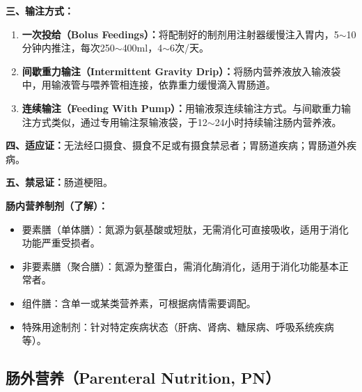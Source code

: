 \begin{tipbox}
\textbf{三、输注方式：}
\begin{enumerate}[leftmargin=*]
    \item \textbf{一次投给（Bolus Feedings）：}将配制好的制剂用注射器缓慢注入胃内，5$\sim$10分钟内推注，每次250$\sim$400ml，4$\sim$6次/天。
    \item \textbf{间歇重力输注（Intermittent Gravity Drip）：}将肠内营养液放入输液袋中，用输液管与喂养管相连接，依靠重力缓慢滴入胃肠道。
    \item \textbf{连续输注（Feeding With Pump）：}用输液泵连续输注方式。与间歇重力输注方式类似，通过专用输注泵输液袋，于12$\sim$24小时持续输注肠内营养液。
\end{enumerate}

\textbf{四、适应证：}无法经口摄食、摄食不足或有摄食禁忌者；胃肠道疾病；胃肠道外疾病。

\textbf{五、禁忌证：}肠道梗阻。

\textbf{肠内营养制剂（了解）：}
\begin{itemize}[leftmargin=*]
    \item 要素膳（单体膳）：氮源为氨基酸或短肽，无需消化可直接吸收，适用于消化功能严重受损者。
    \item 非要素膳（聚合膳）：氮源为整蛋白，需消化酶消化，适用于消化功能基本正常者。
    \item 组件膳：含单一或某类营养素，可根据病情需要调配。
    \item 特殊用途制剂：针对特定疾病状态（肝病、肾病、糖尿病、呼吸系统疾病等）。
\end{itemize}
\end{tipbox}

\subsection{肠外营养（Parenteral Nutrition, PN）}

